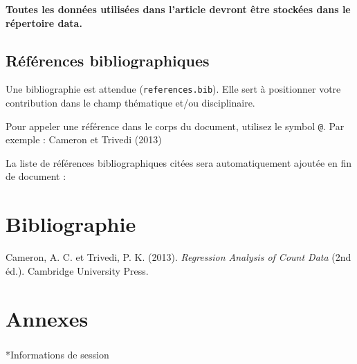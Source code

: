 \documentclass[
  french,
  11pt,
  a4paper,
]{article}
\makeatletter
\let\oldsubparagraph\subparagraph
\renewcommand{\subparagraph}{
    \@ifstar
      \xxxSubParagraphStar
      \xxxSubParagraphNoStar
  }
\newcommand{\xxxSubParagraphStar}[1]{\oldsubparagraph*{#1}\mbox{}}
\newcommand{\xxxSubParagraphNoStar}[1]{\oldsubparagraph{#1}\mbox{}}
\newlength{\cslhangindent}
\newenvironment{CSLReferences}[2] %
 {\begin{list}{}{%
  \setlength{\itemindent}{0pt}
  \setlength{\leftmargin}{0pt}
  \setlength{\parsep}{0pt}
  \ifodd #1
   \setlength{\leftmargin}{\cslhangindent}
   \setlength{\itemindent}{-1\cslhangindent}
  \fi
  \setlength{\itemsep}{#2\baselineskip}}}
 {\end{list}}
\makeatother
\begin{document}
\textbf{Toutes les données utilisées dans l'article devront être
stockées dans le répertoire data.}

\subsection{Références
bibliographiques}\label{ruxe9fuxe9rences-bibliographiques}

Une bibliographie est attendue (\texttt{references.bib}). Elle sert à
positionner votre contribution dans le champ thématique et/ou
disciplinaire.

Pour appeler une référence dans le corps du document, utilisez le symbol
\texttt{@}. Par exemple : Cameron et Trivedi (2013)

La liste de références bibliographiques citées sera automatiquement
ajoutée en fin de document :

\section*{Bibliographie}\label{bibliographie}

\label{refs}
\begin{CSLReferences}{1}{0}
Cameron, A. C. et Trivedi, P. K. (2013). \emph{Regression Analysis of
Count Data} (2nd éd.). Cambridge University Press.

\end{CSLReferences}

\section*{Annexes}\label{annexes}

\subparagraph*{Informations de session}\label{informations-de-session}
\end{document}
